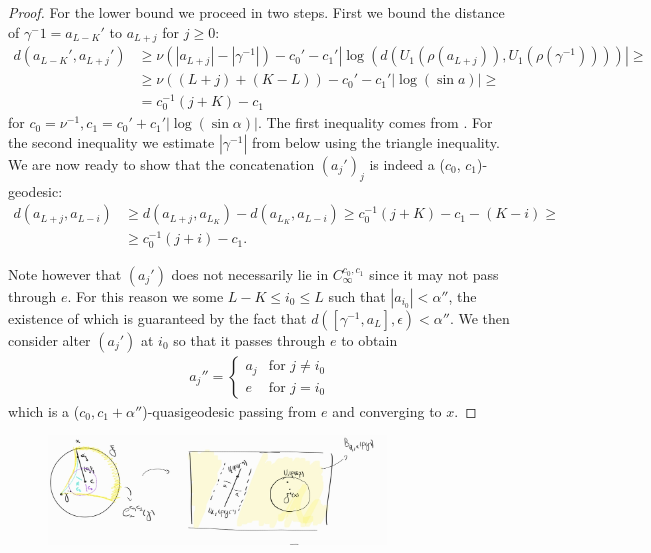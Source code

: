 \documentclass{report}
\begin{document}
\begin{proof}
    For the lower bound we proceed in two steps. 
    First we bound the distance of $\gamma^-1 = a_{L-K}'$ to $a_{L+j}$ for $j\geq 0$:
    \begin{align*}
        d(a_{L-K}', a_{L+j}') 
        &\geq \nu (|a_{L+j}| - |\gamma^{-1}|) - c_0' -c_1'|\log(d(U_1(\rho(a_{L+j})), U_1(\rho(\gamma^{-1}))))| \geq\\
        &\geq \nu((L+j) + (K-L)) - c_0' -c_1'|\log(\sin a)| \geq\\
        &= c_0^{-1} (j+K) - c_1
    \end{align*}
    for $c_0 = \nu^{-1}, c_1 = c_0' + c_1'|\log(\sin \alpha)|$.
    The first inequality comes from \cite[Lemma 3.9]{pozzetti_anosov_2023}. For the second inequality we estimate $|\gamma^{-1}|$ from below using the triangle inequality.
    We are now ready to show that the concatenation $(a_j')_j$ is indeed a ($c_0$, $c_1$)-geodesic:
    \begin{align*}
        d(a_{L+j}, a_{L-i}) &\geq d(a_{L+j},a_{L_K}) - d(a_{L_K}, a_{L-i}) \geq
        c_0^{-1} (j+K) - c_1 - (K - i) \geq\\
        &\geq c_0^{-1} (j+i) - c_1.
    \end{align*}

    Note however that $(a_j')$ does not necessarily lie in $C_\infty^{c_0, c_1}$ since it may not pass through $e$.
    For this reason we some $L - K \leq i_0\leq L$ such that $|a_{i_0}| < \alpha''$, the existence of which is guaranteed by the fact that $d([\gamma^{-1}, a_L], \epsilon) < \alpha''$.
    We then consider alter $(a_j')$ at $i_0$ so that it passes through $e$ to obtain 
    \begin{align*}
        a_j''=
        \begin{cases}
            a_j & \text{for } j\neq i_0 \\
            e & \text{for } j = i_0
        \end{cases}      
    \end{align*}
    which is a ($c_0, c_1 + \alpha''$)-quasigeodesic passing from $e$ and converging to $x$.
\end{proof}
\begin{figure}[h]
    \centering
    \includegraphics[width=0.8\textwidth]{cone.jpg}
\end{figure}    
\printbibliography
\end{document}
